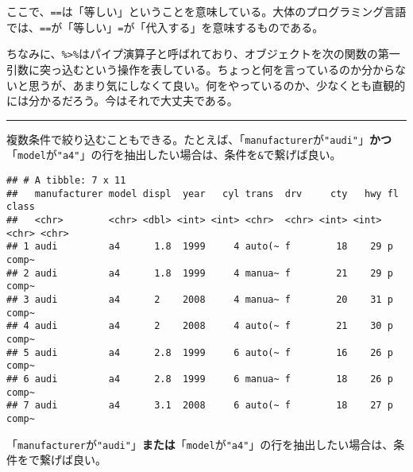 \documentclass[]{book}
\newenvironment{Shaded}{\begin{snugshade}}{\end{snugshade}}
\newcommand{\KeywordTok}[1]{\textcolor[rgb]{0.13,0.29,0.53}{\textbf{#1}}}
\newcommand{\StringTok}[1]{\textcolor[rgb]{0.31,0.60,0.02}{#1}}
\newcommand{\OperatorTok}[1]{\textcolor[rgb]{0.81,0.36,0.00}{\textbf{#1}}}
\newcommand{\NormalTok}[1]{#1}
\begin{document}
ここで、\texttt{==}は「等しい」ということを意味している。大体のプログラミング言語では、\texttt{==}が「等しい」\texttt{=}が「代入する」を意味するものである。

ちなみに、\texttt{\%\textgreater{}\%}はパイプ演算子と呼ばれており、オブジェクトを次の関数の第一引数に突っ込むという操作を表している。ちょっと何を言っているのか分からないと思うが、あまり気にしなくて良い。何をやっているのか、少なくとも直観的には分かるだろう。今はそれで大丈夫である。

\begin{center}\rule{0.5\linewidth}{\linethickness}\end{center}

複数条件で絞り込むこともできる。たとえば、「\texttt{manufacturer}が\texttt{"audi"}」\textbf{かつ}「\texttt{model}が\texttt{"a4"}」の行を抽出したい場合は、条件を\texttt{\&}で繋げば良い。

\begin{Shaded}
\end{Shaded}

\begin{verbatim}
## # A tibble: 7 x 11
##   manufacturer model displ  year   cyl trans  drv     cty   hwy fl    class
##   <chr>        <chr> <dbl> <int> <int> <chr>  <chr> <int> <int> <chr> <chr>
## 1 audi         a4      1.8  1999     4 auto(~ f        18    29 p     comp~
## 2 audi         a4      1.8  1999     4 manua~ f        21    29 p     comp~
## 3 audi         a4      2    2008     4 manua~ f        20    31 p     comp~
## 4 audi         a4      2    2008     4 auto(~ f        21    30 p     comp~
## 5 audi         a4      2.8  1999     6 auto(~ f        16    26 p     comp~
## 6 audi         a4      2.8  1999     6 manua~ f        18    26 p     comp~
## 7 audi         a4      3.1  2008     6 auto(~ f        18    27 p     comp~
\end{verbatim}

「\texttt{manufacturer}が\texttt{"audi"}」\textbf{または}「\texttt{model}が\texttt{"a4"}」の行を抽出したい場合は、条件を\texttt{\textbar{}}で繋げば良い。

\begin{Shaded}
\end{Shaded}
\end{document}
